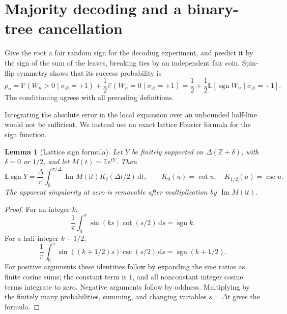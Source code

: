 \documentclass[11pt]{article}
\newtheorem{lemma}[theorem]{Lemma}
\theoremstyle{definition}
\newcommand{\E}{\mathbb E}
\newcommand{\Prob}{\mathbb P}
\newcommand{\sgn}{\operatorname{sgn}}
\newcommand{\dd}{\,\mathrm d}
\newcommand{\ii}{\mathrm i}
\begin{document}
\section{Majority decoding and a binary-tree cancellation}

Give the root a fair random sign for the decoding experiment, and
predict it by the sign of the sum of the leaves, breaking ties by an
independent fair coin. Spin-flip symmetry shows that its success
probability is
\begin{equation}\label{eq:majority-def}
 p_n=\Prob(W_n>0\mid\sigma_{\varnothing}=+1)
          +\frac12\Prob(W_n=0\mid\sigma_{\varnothing}=+1)
      =\frac12+\frac12\E[\sgn W_n\mid\sigma_{\varnothing}=+1].
\end{equation}
The conditioning agrees with all preceding definitions.

Integrating the absolute error in the local expansion over an unbounded
half-line would not be sufficient. We instead use an exact lattice
Fourier formula for the sign function.

\begin{lemma}[Lattice sign formula]\label{lem:sign}
Let $Y$ be finitely supported on $\Delta(\mathbb Z+\delta)$, with
$\delta=0$ or $1/2$, and let $M(t)=\E e^{tY}$. Then
\begin{equation}\label{eq:sign-integral}
 \E\sgn Y=\frac{\Delta}{\pi}
       \int_0^{\pi/\Delta}\operatorname{Im}M(\ii t)
           K_\delta(\Delta t/2)\dd t,
 \qquad K_0(u)=\cot u,\quad K_{1/2}(u)=\csc u.
\end{equation}
The apparent singularity at zero is removable after multiplication by
$\operatorname{Im}M(\ii t)$.
\end{lemma}

\begin{proof}
For an integer $k$,
\[
 \frac1\pi\int_0^\pi\sin(ks)\cot(s/2)\dd s=\sgn k.
\]
For a half-integer $k+1/2$,
\[
 \frac1\pi\int_0^\pi\sin((k+1/2)s)\csc(s/2)\dd s
                         =\sgn(k+1/2).
\]
For positive arguments these identities follow by expanding the sine
ratios as finite cosine sums; the constant term is $1$, and all
nonconstant integer cosine terms integrate to zero. Negative arguments
follow by oddness. Multiplying by the finitely many probabilities,
summing, and changing variables $s=\Delta t$ gives the formula.
\end{proof}
\end{document}
